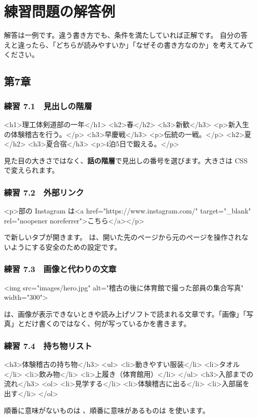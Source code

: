 \chapter{練習問題の解答例}

解答は一例です。違う書き方でも、条件を満たしていれば正解です。
自分の答えと違ったら、「どちらが読みやすいか」「なぜその書き方なのか」を考えてみてください。

\section*{第7章}

\subsection*{練習 7.1　見出しの階層}
\begin{Piton}[language=code]
<h1>理工体剣道部の一年</h1>
<h2>春</h2>
<h3>新歓</h3>
<p>新入生の体験稽古を行う。</p>
<h3>早慶戦</h3>
<p>伝統の一戦。</p>
<h2>夏</h2>
<h3>夏合宿</h3>
<p>4泊5日で鍛える。</p>
\end{Piton}
見た目の大きさではなく、\textbf{話の階層}で見出しの番号を選びます。大きさは CSS で変えられます。

\subsection*{練習 7.2　外部リンク}
\begin{Piton}[language=code]
<p>部の Instagram は<a href="https://www.instagram.com/" target="_blank" rel="noopener noreferrer">こちら</a></p>
\end{Piton}
 で新しいタブが開きます。 は、開いた先のページから元のページを操作されないようにする安全のための設定です。

\subsection*{練習 7.3　画像と代わりの文章}
\begin{Piton}[language=code]
<img src="images/hero.jpg" alt="稽古の後に体育館で撮った部員の集合写真" width="300">
\end{Piton}
 は、画像が表示できないときや読み上げソフトで読まれる文章です。「画像」「写真」とだけ書くのではなく、何が写っているかを書きます。

\subsection*{練習 7.4　持ち物リスト}
\begin{Piton}[language=code]
<h3>体験稽古の持ち物</h3>
<ul>
  <li>動きやすい服装</li>
  <li>タオル</li>
  <li>飲み物</li>
  <li>上履き（体育館用）</li>
</ul>
<h3>入部までの流れ</h3>
<ol>
  <li>見学する</li>
  <li>体験稽古に出る</li>
  <li>入部届を出す</li>
</ol>
\end{Piton}
順番に意味がないものは 、順番に意味があるものは  を使います。

